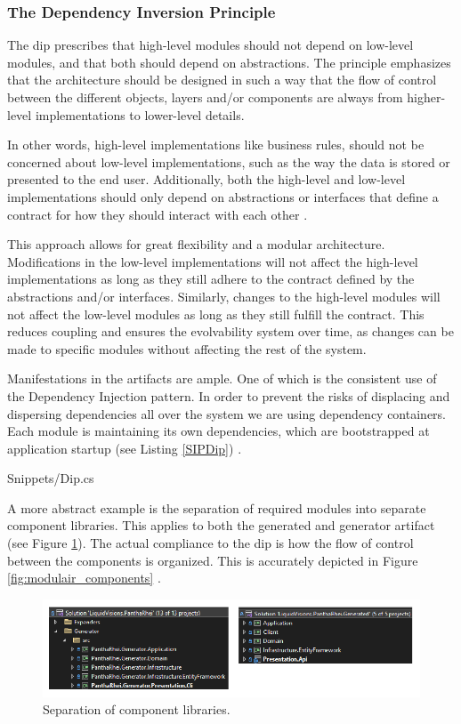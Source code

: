 \subsubsection*{The Dependency Inversion Principle} \label{subsubsec:dip}

The \gls{dip} prescribes that high-level modules should not depend on low-level modules,
and that both should depend on abstractions. The principle emphasizes that the
architecture should be designed in such a way that the flow of control between the
different objects, layers and/or components are always from higher-level implementations
to lower-level details.

In other words, high-level implementations like business rules, should not be concerned
about low-level implementations, such as the way the data is stored or presented to the
end user. Additionally, both the high-level and low-level implementations should only
depend on abstractions or interfaces that define a contract for how they should interact
with each other \parencite[109]{robert_c_martin_clean_2018}.

This approach allows for great flexibility and a modular architecture. Modifications in
the low-level implementations will not affect the high-level implementations as long as
they still adhere to the contract defined by the abstractions and/or interfaces.
Similarly, changes to the high-level modules will not affect the low-level modules as long
as they still fulfill the contract. This reduces coupling and ensures the evolvability
system over time, as changes can be made to specific modules without affecting the rest of
the system.

Manifestations in the artifacts are ample. One of which is the consistent use of the
Dependency Injection pattern. In order to prevent the risks of displacing and dispersing
dependencies all over the system \parencite[214]{mannaert_normalized_2016} we are using
dependency containers. Each module is maintaining its own dependencies, which are
bootstrapped at application startup (see Listing \ref{SIPDip})
\parencite{koks_generator_2023}.


    {Snippets/Dip.cs}

A more abstract example is the separation of required modules into separate component
libraries. This applies to both the generated and generator artifact (see Figure
\ref{fig:solutions}). The actual compliance to the \gls{dip} is how the flow of control
between the components is organized. This is accurately depicted in Figure
\ref{fig:modulair_components} .

\begin{figure}[H]
    \centering
    \includegraphics[width=1\textwidth]{Figures/solutions.pdf}
    \caption[modularity]{Separation of component libraries.}
    \label{fig:solutions}
\end{figure}